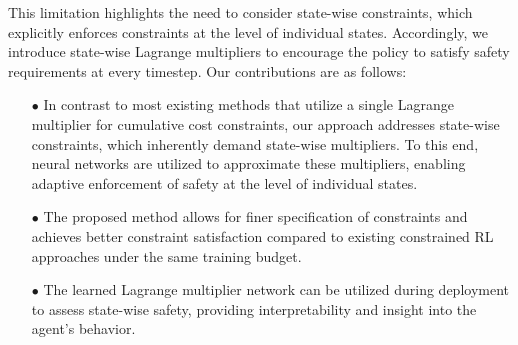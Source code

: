 This limitation highlights the need to consider state-wise constraints, which explicitly enforces constraints at the level of individual states.  %
Accordingly, we introduce state-wise Lagrange multipliers to encourage the policy to satisfy safety requirements at every timestep.
Our contributions are as follows:
\begin{itemize}
    \item[$\bullet$] In contrast to most existing methods that utilize a single Lagrange multiplier for cumulative cost constraints, our approach addresses state-wise constraints, which inherently demand state-wise multipliers.
    To this end, neural networks are utilized to approximate these multipliers, enabling adaptive enforcement of safety at the level of individual states.
    \item[$\bullet$] The proposed method allows for finer specification of constraints and achieves better constraint satisfaction compared to existing constrained RL approaches under the same training budget.
    \item[$\bullet$] The learned Lagrange multiplier network can be utilized during deployment to assess state-wise safety, providing interpretability and insight into the agent’s behavior.
\end{itemize}
